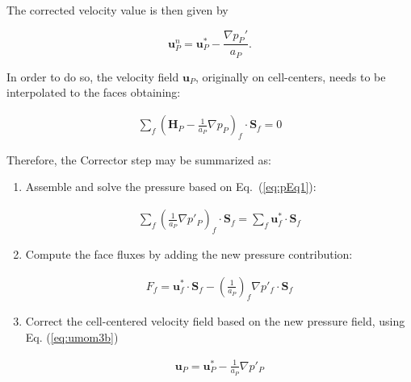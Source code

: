 \documentclass[final,3p,times,10pt,onecolumn]{myElsarticle}
\numberwithin{equation}{section}
\newcommand{\CIP}[1]{{\color{blue} #1}}
\begin{document}
The corrected velocity value is then given by

\begin{equation}\label{eq:SIMPLECorr}
\boldsymbol{u}_P^n = \boldsymbol{u}_P^* - \frac{\nabla p_P'}{a_P}.
\end{equation}

\iffalse
 In order to do so, the velocity field $\boldsymbol{u}_P$, originally on cell-centers, needs to be interpolated to the faces obtaining: 

 \begin{equation}
 \begin{split}
 \sum_{f} \left( \boldsymbol{H}_P - \frac{1}{a_P} \nabla p_P  \right)_f \cdotp \textbf{S}_{f} = 0 
 \end{split}
 \label{eq:pEq1} 
 \end{equation}

Therefore, the Corrector step may be summarized as:

\begin{enumerate}

\item Assemble and solve the pressure based on Eq.~(\ref{eq:pEq1}):

\begin{equation}
\begin{split}
\sum_{f} \left( \frac{1}{a_P} \nabla p'_P \right)_f \cdotp \textbf{S}_{f} = \sum_{f} \boldsymbol{u}^*_f \cdotp \textbf{S}_{f}
\end{split}
\label{eq:pEq2} 
\end{equation}



\item {\color{red}Compute} the face fluxes by adding the new pressure contribution:

\begin{equation}
\begin{split}
F_f = \boldsymbol{u}^*_f \cdotp \textbf{S}_{f} -  \left( \frac{1}{a_P}\right)_f \nabla p'_f  \cdotp \textbf{S}_{f}
\end{split}
\label{eq:Fhat} 
\end{equation}

\item Correct the cell-centered velocity field based on the new pressure field, using Eq. (\ref{eq:umom3b})

\begin{equation}\label{eq:umom3b}
\begin{split}
\boldsymbol{u}_P = \boldsymbol{u}^*_P - \frac{1}{a_P} \nabla p'_P 
\end{split}
\end{equation}

\end{enumerate}
\end{document}
